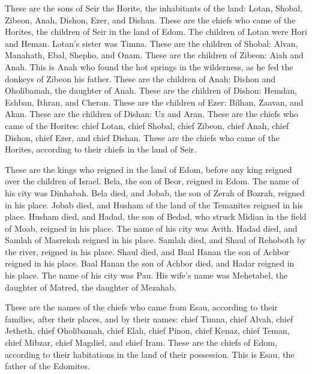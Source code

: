 \myverse{}These are the sons of Seir the Horite, the inhabitants of the land: Lotan, Shobal, Zibeon, Anah,   \myverse{}Dishon, Ezer, and Dishan. These are the chiefs who came of the Horites, the children of Seir in the land of Edom.   \myverse{}The children of Lotan were Hori and Heman. Lotan’s sister was Timna.   \myverse{}These are the children of Shobal: Alvan, Manahath, Ebal, Shepho, and Onam.   \myverse{}These are the children of Zibeon: Aiah and Anah. This is Anah who found the hot springs in the wilderness, as he fed the donkeys of Zibeon his father.   \myverse{}These are the children of Anah: Dishon and Oholibamah, the daughter of Anah.   \myverse{}These are the children of Dishon: Hemdan, Eshban, Ithran, and Cheran.   \myverse{}These are the children of Ezer: Bilhan, Zaavan, and Akan.   \myverse{}These are the children of Dishan: Uz and Aran.   \myverse{}These are the chiefs who came of the Horites: chief Lotan, chief Shobal, chief Zibeon, chief Anah,   \myverse{}chief Dishon, chief Ezer, and chief Dishan. These are the chiefs who came of the Horites, according to their chiefs in the land of Seir.

\myverse{}These are the kings who reigned in the land of Edom, before any king reigned over the children of Israel.   \myverse{}Bela, the son of Beor, reigned in Edom. The name of his city was Dinhabah.   \myverse{}Bela died, and Jobab, the son of Zerah of Bozrah, reigned in his place.   \myverse{}Jobab died, and Husham of the land of the Temanites reigned in his place.   \myverse{}Husham died, and Hadad, the son of Bedad, who struck Midian in the field of Moab, reigned in his place. The name of his city was Avith.   \myverse{}Hadad died, and Samlah of Masrekah reigned in his place.   \myverse{}Samlah died, and Shaul of Rehoboth by the river, reigned in his place.   \myverse{}Shaul died, and Baal Hanan the son of Achbor reigned in his place.   \myverse{}Baal Hanan the son of Achbor died, and Hadar reigned in his place. The name of his city was Pau. His wife’s name was Mehetabel, the daughter of Matred, the daughter of Mezahab.

\myverse{}These are the names of the chiefs who came from Esau, according to their families, after their places, and by their names: chief Timna, chief Alvah, chief Jetheth,   \myverse{}chief Oholibamah, chief Elah, chief Pinon,   \myverse{}chief Kenaz, chief Teman, chief Mibzar,   \myverse{}chief Magdiel, and chief Iram. These are the chiefs of Edom, according to their habitations in the land of their possession. This is Esau, the father of the Edomites.

